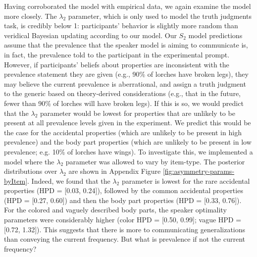 \documentclass[12pt,letterpaper]{article}
\begin{document}
Having corroborated the model with empirical data, we again examine the model more closely.
The $\lambda_2$ parameter, which is only used to model the truth judgments task, is credibly below 1: participants' behavior is slightly more random than veridical Bayesian updating according to our model.
Our $S_2$ model predictions assume that the prevalence that the speaker model is aiming to communicate is, in fact, the prevalence told to the participant in the experimental prompt.
However, if participants' beliefs about properties are inconsistent with the prevalence statement they are given (e.g., 90\% of lorches have broken legs), they may believe the current prevalence is aberrational, and assign a truth judgment to the generic based on theory-derived considerations (e.g., that in the future, fewer than 90\% of lorches will have broken legs).
If this is so, we would predict that the $\lambda_2$ parameter would be lowest for properties that are unlikely to be present at all prevalence levels given in the experiment.
We predict this would be the case for the accidental properties (which are unlikely to be present in high prevalence) and the body part properties (which are unlikely to be present in low prevalence; e.g. 10\% of lorches have wings).
To investigate this, we implemented a model where the $\lambda_2$ parameter was allowed to vary by item-type.
The posterior distributions over $\lambda_2$ are shown in Appendix Figure \ref{fig:asymmetry-params-byItem}.
Indeed, we found that the $\lambda_2$ parameter is lowest for the rare accidental properties (HPD = [0.03, 0.24]), followed by the common accidental properties (HPD = [0.27, 0.60]) and then the body part properties (HPD = [0.33, 0.76]).
For the colored and vaguely described body parts, the speaker optimality parameters were considerably higher (color HPD = [0.50, 0.99]; vague HPD = [0.72, 1.32]).
This suggests that there is more to communicating generalizations than conveying the current frequency. %
But what is prevalence if not the current frequency?


%
\end{document}
